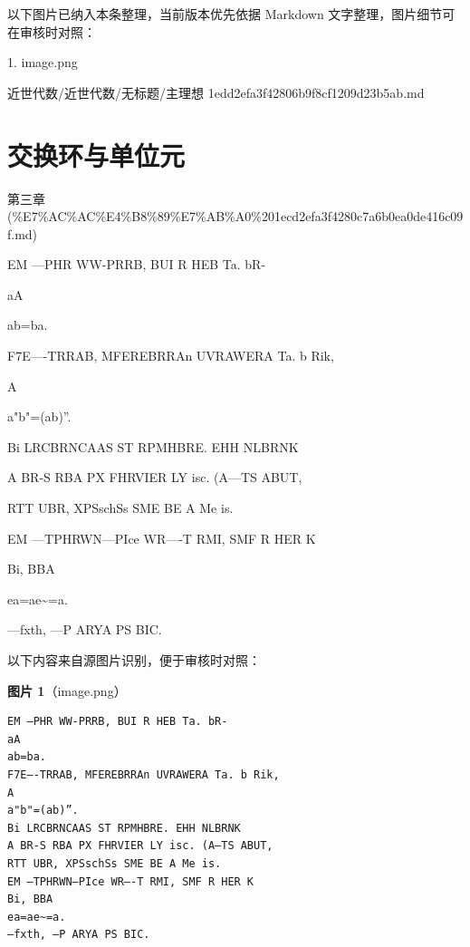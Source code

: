 \begin{note}[关联图片]
以下图片已纳入本条整理，当前版本优先依据 Markdown 文字整理，图片细节可在审核时对照：

1. image.png\\

\end{note}

\begin{note}[来源路径]

近世代数/近世代数/无标题/主理想 1edd2efa3f42806b9f8cf1209d23b5ab.md

\end{note}

\section*{交换环与单位元}

\begin{note}[来源上级主题]

第三章 (\%E7\%AC\%AC\%E4\%B8\%89\%E7\%AB\%A0\%201ecd2efa3f4280c7a6b0ea0de416c09f.md)

\end{note}

\begin{note}[交换环与单位元]

EM —PHR WW-PRRB, BUI R HEB Ta. bR-

aA

ab=ba.

F7E—-TRRAB, MFEREBRRAn UVRAWERA Ta. b Rik,

A

a"b"=(ab)”.

Bi LRCBRNCAAS ST RPMHBRE. EHH NLBRNK

A BR-S RBA PX FHRVIER LY isc. (A—TS ABUT,

RTT UBR, XPSschSs SME BE A Me is.

EM —TPHRWN—PIce WR—-T RMI, SMF R HER K

Bi, BBA

ea=ae\textasciitilde{}=a.

—fxth, —P ARYA PS BIC.

\end{note}

\begin{note}
以下内容来自源图片识别，便于审核时对照：

\textbf{图片 1}（image.png）
\begin{Verbatim}[fontsize=\small]
EM —PHR WW-PRRB, BUI R HEB Ta. bR-
aA
ab=ba.
F7E—-TRRAB, MFEREBRRAn UVRAWERA Ta. b Rik,
A
a"b"=(ab)”.
Bi LRCBRNCAAS ST RPMHBRE. EHH NLBRNK
A BR-S RBA PX FHRVIER LY isc. (A—TS ABUT,
RTT UBR, XPSschSs SME BE A Me is.
EM —TPHRWN—PIce WR—-T RMI, SMF R HER K
Bi, BBA
ea=ae~=a.
—fxth, —P ARYA PS BIC.
\end{Verbatim}

\end{note}

